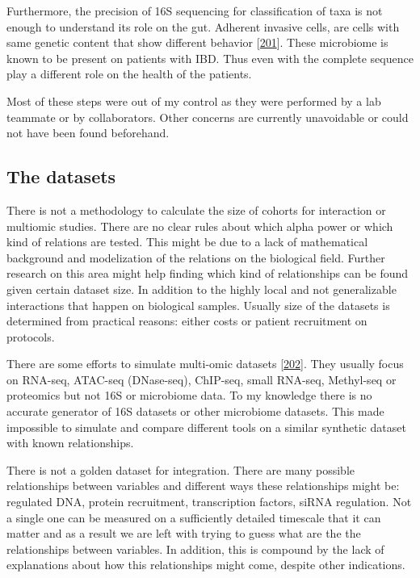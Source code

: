 \documentclass[
  a4paper,
]{book}
\begin{document}
Furthermore, the precision of 16S sequencing for classification of taxa is not enough to understand its role on the gut.
Adherent invasive cells, are cells with same genetic content that show different behavior {[}\protect\hyperlink{ref-nadalian2021}{201}{]}.
These microbiome is known to be present on patients with IBD.
Thus even with the complete sequence play a different role on the health of the patients.

Most of these steps were out of my control as they were performed by a lab teammate or by collaborators.
Other concerns are currently unavoidable or could not have been found beforehand.

\hypertarget{discussion-datasets}{%
\subsection{The datasets}\label{discussion-datasets}}

There is not a methodology to calculate the size of cohorts for interaction or multiomic studies.
There are no clear rules about which alpha power or which kind of relations are tested.
This might be due to a lack of mathematical background and modelization of the relations on the biological field.
Further research on this area might help finding which kind of relationships can be found given certain dataset size.
In addition to the highly local and not generalizable interactions that happen on biological samples.
Usually size of the datasets is determined from practical reasons: either costs or patient recruitment on protocols.

There are some efforts to simulate multi-omic datasets {[}\protect\hyperlink{ref-martuxednez-mira2018}{202}{]}.
They usually focus on RNA-seq, ATAC-seq (DNase-seq), ChIP-seq, small RNA-seq, Methyl-seq or proteomics but not 16S or microbiome data.
To my knowledge there is no accurate generator of 16S datasets or other microbiome datasets.
This made impossible to simulate and compare different tools on a similar synthetic dataset with known relationships.

There is not a golden dataset for integration.
There are many possible relationships between variables and different ways these relationships might be: regulated DNA, protein recruitment, transcription factors, siRNA regulation.
Not a single one can be measured on a sufficiently detailed timescale that it can matter and as a result we are left with trying to guess what are the the relationships between variables.
In addition, this is compound by the lack of explanations about how this relationships might come, despite other indications.
\end{document}
